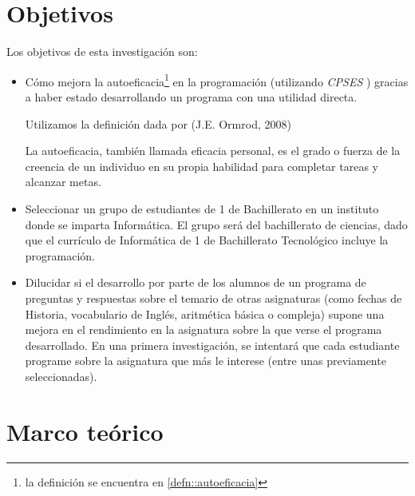 \documentclass[palatino,miniheader]{apuntesURJC}
\newcommand{\CPSES}{\textit{\gls{CPSES}} \cite{CPSES}}
\begin{document}
\chapter{Objetivos}

Los objetivos de esta investigación son:
\begin{itemize}
	\item Cómo mejora la autoeficacia\footnote{la definición se encuentra en \ref{defn::autoeficacia}} en la programación (utilizando \CPSES) gracias a haber estado desarrollando un programa con una utilidad directa.
	
	\begin{defn}[Autoeficacia]
	\label{defn::autoeficacia}

	Utilizamos la definición dada por (J.E. Ormrod, 2008) \cite{autoef}

	La autoeficacia, también llamada eficacia personal, es el grado o fuerza de la creencia de un individuo en su propia habilidad para completar tareas y alcanzar metas.

	\end{defn}

	\item Seleccionar un grupo de estudiantes de 1 de Bachillerato en un instituto donde se imparta Informática.  
	El grupo será del bachillerato de ciencias, dado que el currículo de Informática de 1 de Bachillerato Tecnológico incluye la programación.
	\item Dilucidar si el desarrollo por parte de los alumnos de un programa de preguntas y respuestas sobre el temario de otras asignaturas (como fechas de Historia, vocabulario de Inglés, aritmética básica o compleja) supone una mejora en el rendimiento en la asignatura sobre la que verse el programa desarrollado.
		\subitem En una primera investigación, se intentará que cada estudiante programe sobre la asignatura que más le interese (entre unas previamente seleccionadas).
\end{itemize}


\chapter{Marco teórico}
\end{document}
